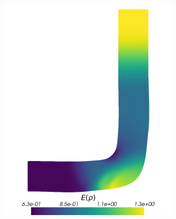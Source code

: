 \begin{figure}[H]
\begin{subfigure}{0.31\linewidth}
		\includegraphics[width=\linewidth]{figs/pipe/euler2D_pipe_adipm_n1-2_ERho.png}
		\caption{}
		\label{fig:adIPMSolutionsPipeSGE}
	\end{subfigure}%
	\hfill
	\begin{subfigure}{0.31\linewidth}
		\centering

\end{subfigure}
\end{figure}
